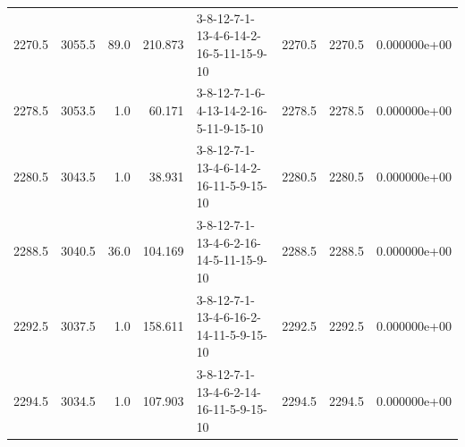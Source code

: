 \begin{tabular}{rrrrlrrr}
 2270.5 &  3055.5 &           89.0 &            210.873 &  3-8-12-7-1-13-4-6-14-2-16-5-11-15-9-10 &        2270.5 &          2270.5 &  0.000000e+00 \\
 2278.5 &  3053.5 &            1.0 &             60.171 &  3-8-12-7-1-6-4-13-14-2-16-5-11-9-15-10 &        2278.5 &          2278.5 &  0.000000e+00 \\
 2280.5 &  3043.5 &            1.0 &             38.931 &  3-8-12-7-1-13-4-6-14-2-16-11-5-9-15-10 &        2280.5 &          2280.5 &  0.000000e+00 \\
 2288.5 &  3040.5 &           36.0 &            104.169 &  3-8-12-7-1-13-4-6-2-16-14-5-11-15-9-10 &        2288.5 &          2288.5 &  0.000000e+00 \\
 2292.5 &  3037.5 &            1.0 &            158.611 &  3-8-12-7-1-13-4-6-16-2-14-11-5-9-15-10 &        2292.5 &          2292.5 &  0.000000e+00 \\
 2294.5 &  3034.5 &            1.0 &            107.903 &  3-8-12-7-1-13-4-6-2-14-16-11-5-9-15-10 &        2294.5 &          2294.5 &  0.000000e+00 \\
\bottomrule
\end{tabular}
